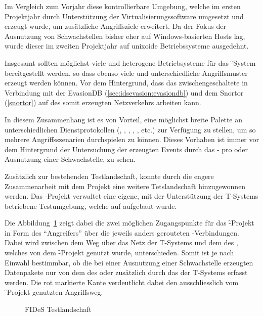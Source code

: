 Im Vergleich zum Vorjahr diese kontrollierbare Umgebung, welche im
ersten Projektjahr durch Unterstützung der Virtualisierungssoftware
 umgesetzt und erzeugt wurde, um zusätzliche
Angriffsziele erweitert. Da der Fokus der Ausnutzung von
Schwachstellen bisher eher auf Windows-basierten Hosts lag, wurde
dieser im zweiten Projektjahr auf unixoide Betriebssysteme ausgedehnt.

Insgesamt sollten möglichst viele und heterogene Betriebsysteme für
das \f-System bereitgestellt werden, so dass ebenso viele und
unterschiedliche Angriffsmuster erzeugt werden können. Vor dem
Hintergrund, dass das zwischengeschaltete  in Verbindung mit
der EvasionDB (\ref{sec:idsevasion:evasiondb}) und dem 
Snortor (\ref{snortor}) auf des somit erzeugten Netzverkehrs arbeiten
kann.

In diesem Zusammenhang ist es von Vorteil, eine möglichst breite
Palette an unterschiedlichen Dienstprotokollen (, ,
, , ,  etc.) zur Verfügung zu
stellen, um so mehrere Angriffsszenarien durchspielen zu
können. Dieses Vorhaben ist immer vor dem Hintergrund der Untersuchung
der erzeugten Events durch das - pro
 oder Ausnutzung einer Schwachstelle, zu
sehen.

Zusätzlich zur bestehenden Testlandschaft, konnte durch die engere
Zusammenarbeit mit dem Projekt  eine weitere Tetslandschaft
hinzugewonnen werden. Das -Projekt verwaltet eine eigene,
mit der Unterstützung der T-Systems betriebene Testumgebung, welche
auf  aufgebaut wurde.

Die Abbildung~\ref{sec:test_environment:fig:fides} zeigt dabei die
zwei möglichen Zugangspunkte für das \f-Projekt in Form des
\enquote{Angreifers} über die jeweils anders gerouteten
-Verbindungen. Dabei wird zwischen dem Weg über das Netz der
T-Systems und dem des , welches von dem \f-Projekt genutzt
wurde, unterschieden. Somit ist je nach Einwahl bestimmbar, ob die bei
einer Ausnutzung einer Schwachstelle erzeugten Datenpakete nur von dem
 des  oder zusätzlich durch das der
T-Systems erfasst werden. Die rot markierte Kante verdeutlicht dabei den
ausschliesslich vom \f-Projekt genutzten Angriffsweg.

\begin{figure}
	\centering
	\caption{FIDeS Testlandschaft}
  \label{sec:test_environment:fig:fides}
\end{figure}

